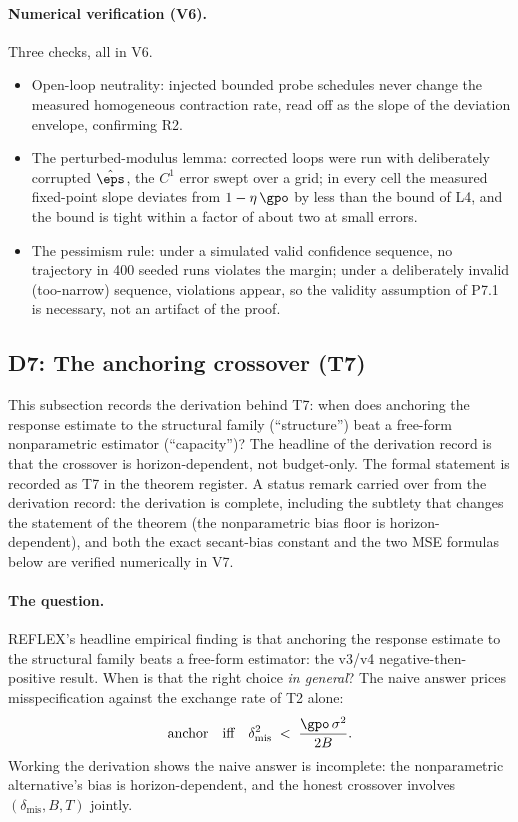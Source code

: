 \paragraph{Numerical verification (V6).}
Three checks, all in V6.
\begin{itemize}
\item Open-loop neutrality: injected bounded probe schedules never change
the measured homogeneous contraction rate, read off as the slope of the
deviation envelope, confirming R2.
\item The perturbed-modulus lemma: corrected loops were run with
deliberately corrupted $\hat\eps$, the $C^1$ error swept over a grid; in
every cell the measured fixed-point slope deviates from $1 - \eta\,\gpo$
by less than the bound of L4, and the bound is tight within a factor of
about two at small errors.
\item The pessimism rule: under a simulated valid confidence sequence, no
trajectory in 400 seeded runs violates the margin; under a deliberately
invalid (too-narrow) sequence, violations appear, so the validity
assumption of P7.1 is necessary, not an artifact of the proof.
\end{itemize}

\subsection*{D7: The anchoring crossover (T7)}

This subsection records the derivation behind T7: when does anchoring the
response estimate to the structural family (``structure'') beat a free-form
nonparametric estimator (``capacity'')? The headline of the derivation
record is that the crossover is horizon-dependent, not budget-only. The
formal statement is recorded as T7 in the theorem register. A status remark
carried over from the derivation record: the derivation is complete,
including the subtlety that changes the statement of the theorem (the
nonparametric bias floor is horizon-dependent), and both the exact
secant-bias constant and the two MSE formulas below are verified
numerically in V7.

\paragraph{The question.}
REFLEX's headline empirical finding is that anchoring the response estimate
to the structural family beats a free-form estimator: the v3/v4
negative-then-positive result. When is that the right choice
\emph{in general}? The naive answer prices misspecification against the
exchange rate of T2 alone:
\begin{equation*}
  \text{anchor} \quad \text{iff} \quad
  \delta_{\mathrm{mis}}^2 \;<\; \frac{\gpo\,\sigma^2}{2B}.
\end{equation*}
Working the derivation shows the naive answer is incomplete: the
nonparametric alternative's bias is horizon-dependent, and the honest
crossover involves $(\delta_{\mathrm{mis}}, B, T)$ jointly.

